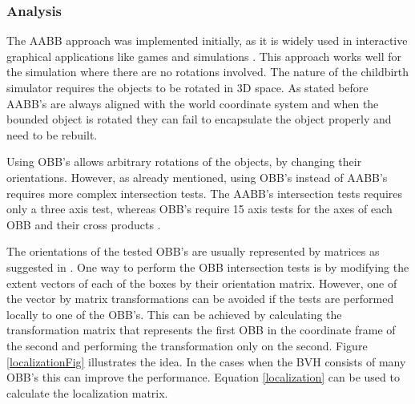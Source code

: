     \subsubsection{Analysis}
  \label{USINGOBBs}
    The AABB approach was implemented initially, as it is widely used in interactive graphical applications like games and simulations \citep{AABBUse}. This approach works well for the simulation where there are no rotations involved. The nature of the childbirth simulator requires the objects to be rotated in 3D space. As stated before AABB's are always aligned with the world coordinate system and when the bounded object is rotated they can fail to encapsulate the object properly and need to be rebuilt.

    Using OBB's allows arbitrary rotations of the objects, by changing their orientations. However, as already mentioned, using OBB's instead of AABB's requires more complex intersection tests. The AABB's intersection tests requires only a three axis test, whereas OBB's require 15 axis tests for the axes of each OBB and their cross products \citep{realTimeColDet}.

    The orientations of the tested OBB's are usually represented by matrices as suggested in \citep{realTimeColDet}. One way to perform the OBB intersection tests is by modifying the extent vectors of each of the boxes by their orientation matrix. However, one of the vector by matrix transformations can be avoided if the tests are performed locally to one of the OBB's. This can be achieved by calculating the transformation matrix that represents the first OBB in the coordinate frame of the second and performing the transformation only on the second. Figure \ref{localizationFig} illustrates the idea. In the cases when the BVH consists of many OBB's this can improve the performance. Equation \ref{localization} can be used to calculate the localization matrix.


